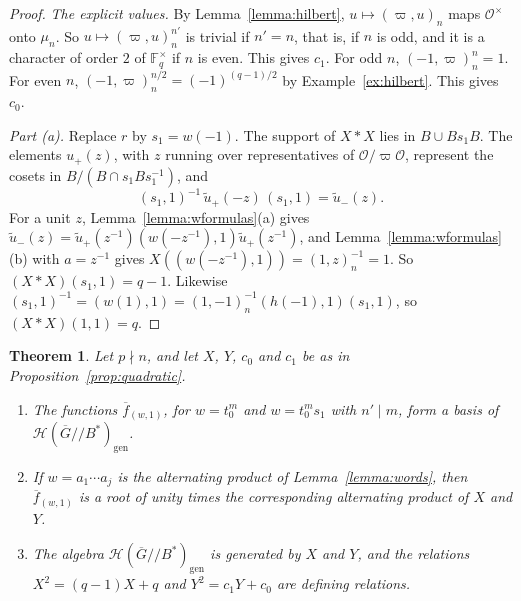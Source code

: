 \documentclass[12pt,letterpaper]{amsart}
\numberwithin{equation}{section}
\newtheorem{theorem}{Theorem}[section]
\theoremstyle{definition}
\theoremstyle{remark}
\newcommand{\cO}{\mathcal{O}}
\newcommand{\cH}{\mathcal{H}}
\newcommand{\Fq}{\mathbb{F}_q}
\newcommand{\Gbar}{\overline{G}}
\newcommand{\gen}{\mathrm{gen}}
\newcommand{\fbar}{\overline{f}}
\begin{document}
\begin{proof}
\emph{The explicit values.} By Lemma~\ref{lemma:hilbert},
$u\mapsto(\varpi,u)_n$ maps $\cO^\times$ onto $\mu_n$. So
$u\mapsto(\varpi,u)_n^{n'}$ is trivial if $n'=n$, that is, if $n$ is
odd, and it is a character of order $2$ of $\Fq^\times$ if $n$ is even.
This gives $c_1$. For odd $n$, $(-1,\varpi)_n^{n}=1$. For even $n$,
$(-1,\varpi)_n^{n/2}=(-1)^{(q-1)/2}$ by Example~\ref{ex:hilbert}. This
gives $c_0$.

\emph{Part (a).} Replace $r$ by $s_1=w(-1)$. The support of $X*X$ lies
in $B\cup Bs_1B$. The elements $u_+(z)$, with $z$ running over
representatives of $\cO/\varpi\cO$, represent the cosets in
$B/(B\cap s_1Bs_1^{-1})$, and
\[
(s_1,1)^{-1}\,\tilde u_+(-z)\,(s_1,1)=\tilde u_-(z).
\]
For a unit $z$,
Lemma~\ref{lemma:wformulas}(a) gives $\tilde u_-(z)=\tilde
u_+(z^{-1})(w(-z^{-1}),1)\tilde u_+(z^{-1})$, and
Lemma~\ref{lemma:wformulas}(b) with $a=z^{-1}$ gives
$X((w(-z^{-1}),1))=(1,z)_n^{-1}=1$. So $(X*X)(s_1,1)=q-1$. Likewise
$(s_1,1)^{-1}=(w(1),1)=(1,-1)_n^{-1}(h(-1),1)(s_1,1)$, so
$(X*X)(1,1)=q$.
\end{proof}

\begin{theorem}
\label{thm:presentation}
Let $p\nmid n$, and let $X$, $Y$, $c_0$ and $c_1$ be as in
Proposition~\ref{prop:quadratic}.
\begin{enumerate}[leftmargin=2em,label=(\alph*)]
\item The functions $\fbar_{(w,1)}$, for $w=t_0^m$ and $w=t_0^ms_1$
with $n'\mid m$, form a basis of $\cH(\Gbar/\!/B^*)_{\gen}$.
\item If $w=a_1\cdots a_j$ is the alternating product of
Lemma~\ref{lemma:words}, then $\fbar_{(w,1)}$ is a root of unity times
the corresponding alternating product of $X$ and $Y$.
\item The algebra $\cH(\Gbar/\!/B^*)_{\gen}$ is generated by $X$ and
$Y$, and the relations $X^2=(q-1)X+q$ and $Y^2=c_1Y+c_0$ are defining
relations.
\end{enumerate}
\end{theorem}
\end{document}
